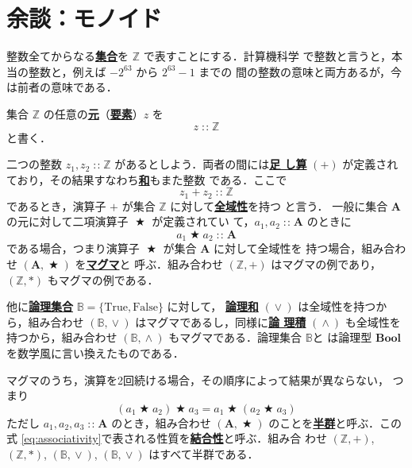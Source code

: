 \documentclass[a5paper,twoside,fleqn,draft]{jsbook}
\newcommand{\keyword}[1]{{\underline{\textbf{#1}}}}
\newcommand{\mSpecialConstant}[1]{\textrm{#1}}
\newcommand{\mFalse}{\mSpecialConstant{False}}
\newcommand{\mTrue}{\mSpecialConstant{True}}
\DeclareMathOperator{\mBinOp}{\bigstar}
\DeclareMathOperator{\mIn}{{:\!:}}
\DeclareMathOperator{\mLogicalAnd}{\wedge}
\DeclareMathOperator{\mLogicalOr}{\vee}
\newcommand{\mSet}[1]{\mathbf{#1}}
\newcommand{\mSpecialSet}[1]{\mathbb{#1}}
\newcommand{\mBSet}{\mSpecialSet{B}}
\newcommand{\mZSet}{\mSpecialSet{Z}}
\newcommand{\mType}[1]{\mathbf{#1}} %
\newcommand{\mBoolType}{\mType{Bool}}
\newcommand{\mTupleWith}[1]{\left(#1\right)} %
\begin{document}
\section{余談：モノイド}

整数全てからなる\keyword{集合}を $\mZSet$ で表すことにする．計算機科学
で整数と言うと，本当の整数と，例えば $-2^{63}$ から $2^{63}-1$ までの
間の整数の意味と両方あるが，今は前者の意味である．

集合 $\mZSet$ の任意の\keyword{元}（\keyword{要素}）$z$ を
\begin{equation}
  z
  \mIn\mZSet
\end{equation}
と書く．

二つの整数 $z_1,z_2\mIn\mZSet$ があるとしよう．両者の間には\keyword{足
  し算} $(+)$ が定義されており，その結果すなわち\keyword{和}もまた整数
である．ここで
\begin{equation}
  z_1+z_2
  \mIn\mZSet
\end{equation}
であるとき，演算子 $+$ が集合 $\mZSet$ に対して\keyword{全域性}を持つ
と言う．
一般に集合 $\mSet{A}$ の元に対して二項演算子 $\mBinOp$ が定義されてい
て，$a_1,a_2\mIn\mSet{A}$ のときに
\begin{equation}
  \label{eq:totality}
  a_1\mBinOp a_2
  \mIn\mSet{A}
\end{equation}
である場合，つまり演算子 $\mBinOp$ が集合 $\mSet{A}$ に対して全域性を
持つ場合，組み合わせ $\mTupleWith{\mSet{A},\mBinOp}$ を\keyword{マグマ}と
呼ぶ．組み合わせ $\mTupleWith{\mZSet,+}$ はマグマの例であり，
$\mTupleWith{\mZSet,*}$ もマグマの例である．

他に\keyword{論理集合} $\mBSet=\{\mTrue,\mFalse\}$ に対して，
\keyword{論理和} $(\mLogicalOr)$ は全域性を持つから，組み合わせ
$\mTupleWith{\mBSet,\mLogicalOr}$ はマグマであるし，同様に\keyword{論
  理積} $(\mLogicalAnd)$ も全域性を持つから，組み合わせ
$\mTupleWith{\mBSet,\mLogicalAnd}$ もマグマである．論理集合 $\mBSet$と
は論理型 $\mBoolType$ を数学風に言い換えたものである．

マグマのうち，演算を2回続ける場合，その順序によって結果が異ならない，
つまり
\begin{equation}
  \label{eq:associativity}
  \left(a_1\mBinOp a_2\right)\mBinOp a_3
  =a_1\mBinOp\left(a_2\mBinOp{a_3}\right)
\end{equation}
ただし $a_1,a_2,a_3\mIn\mSet{A}$ のとき，組み合わせ
$\mTupleWith{\mSet{A},\mBinOp}$ のことを\keyword{半群}と呼ぶ．この式
\eqref{eq:associativity}で表される性質を\keyword{結合性}と呼ぶ．組み合
わせ $\mTupleWith{\mZSet,+}$, $\mTupleWith{\mZSet,*}$,
$\mTupleWith{\mBSet,\mLogicalOr}$, $\mTupleWith{\mBSet,\mLogicalOr}$
はすべて半群である．
\end{document}
